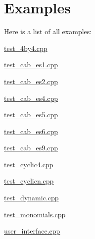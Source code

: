 \section{Examples}
Here is a list of all examples\+:\begin{DoxyCompactItemize}
\item 
\hyperlink{test_4by4_8cpp-example}{test\+\_\+4by4.\+cpp}
\item 
\hyperlink{test_cab_es1_8cpp-example}{test\+\_\+cab\+\_\+es1.\+cpp}
\item 
\hyperlink{test_cab_es2_8cpp-example}{test\+\_\+cab\+\_\+es2.\+cpp}
\item 
\hyperlink{test_cab_es4_8cpp-example}{test\+\_\+cab\+\_\+es4.\+cpp}
\item 
\hyperlink{test_cab_es5_8cpp-example}{test\+\_\+cab\+\_\+es5.\+cpp}
\item 
\hyperlink{test_cab_es6_8cpp-example}{test\+\_\+cab\+\_\+es6.\+cpp}
\item 
\hyperlink{test_cab_es9_8cpp-example}{test\+\_\+cab\+\_\+es9.\+cpp}
\item 
\hyperlink{test_cyclic4_8cpp-example}{test\+\_\+cyclic4.\+cpp}
\item 
\hyperlink{test_cyclicn_8cpp-example}{test\+\_\+cyclicn.\+cpp}
\item 
\hyperlink{test_dynamic_8cpp-example}{test\+\_\+dynamic.\+cpp}
\item 
\hyperlink{test_monomials_8cpp-example}{test\+\_\+monomials.\+cpp}
\item 
\hyperlink{user_interface_8cpp-example}{user\+\_\+interface.\+cpp}
\end{DoxyCompactItemize}
